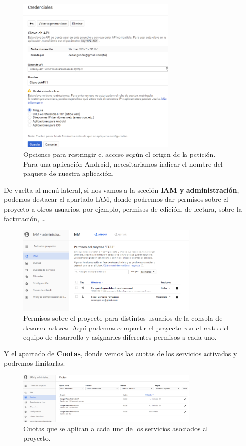 \begin{figure}[H]
\centering
  \includegraphics[width=0.7\textwidth]{Figures/anexo/google_api/api_credential_restriction_options}
  \caption{Opciones para restringir el acceso según el origen de la petición. Para una aplicación Android, necesitariamos indicar el nombre del paquete de nuestra aplicación.}
\end{figure}

De vuelta al menú lateral, si nos vamos a la sección \textbf{IAM y administración}, podemos destacar el apartado \gls{IAM}, donde podremos dar permisos sobre el proyecto a otros usuarios, por ejemplo, permisos de edición, de lectura, sobre la facturación, \ldots

\begin{figure}[H]
\centering
  \includegraphics[width=0.8\textwidth]{Figures/anexo/google_api/iam}
  \caption{Permisos sobre el proyecto para distintos usuarios de la consola de desarrolladores. Aquí podemos compartir el proyecto con el resto del equipo de desarrollo y asignarles diferentes permisos a cada uno.}
\end{figure}

Y el apartado de \textbf{Cuotas}, donde vemos las cuotas de los servicios activados y podremos limitarlas.

\begin{figure}[H]
\centering
  \includegraphics[width=0.8\textwidth]{Figures/anexo/google_api/quota}
  \caption{Cuotas que se aplican a cada uno de los servicios asociados al proyecto.}
\end{figure}
